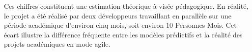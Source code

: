 Ces chiffres constituent une estimation théorique à visée pédagogique. En réalité, le projet a été réalisé par deux développeurs travaillant en parallèle sur une période académique d'environ cinq mois, soit environ 10 Personnes-Mois. Cet écart illustre la différence fréquente entre les modèles prédictifs et la réalité des projets académiques en mode agile.

